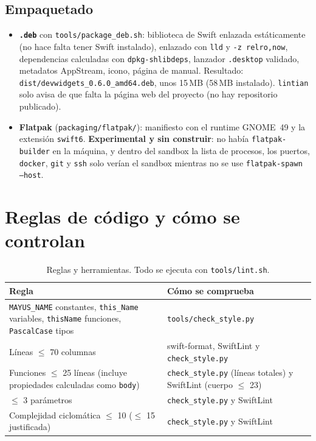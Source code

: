 \documentclass[11pt,a4paper]{article}
\begin{document}
\subsection{Empaquetado}
\begin{itemize}
  \item \textbf{\texttt{.deb}} con \texttt{tools/package\_deb.sh}:
    biblioteca de Swift enlazada estáticamente (no hace falta tener
    Swift instalado), enlazado con \texttt{lld} y \texttt{-z
    relro,now}, dependencias calculadas con \texttt{dpkg-shlibdeps},
    lanzador \texttt{.desktop} validado, metadatos AppStream, icono,
    página de manual. Resultado: \texttt{dist/devwidgets\_0.6.0\_amd64.deb},
    unos 15\,MB (58\,MB instalado). \texttt{lintian} solo avisa de que
    falta la página web del proyecto (no hay repositorio publicado).
  \item \textbf{Flatpak} (\texttt{packaging/flatpak/}): manifiesto
    con el runtime GNOME~49 y la extensión \texttt{swift6}.
    \textbf{Experimental y sin construir}: no había
    \texttt{flatpak-builder} en la máquina, y dentro del sandbox la
    lista de procesos, los puertos, \texttt{docker}, \texttt{git} y
    \texttt{ssh} solo verían el sandbox mientras no se use
    \texttt{flatpak-spawn --host}.
\end{itemize}

\section{Reglas de código y cómo se controlan}
\begin{table}[H]
\centering
\begin{tabularx}{\textwidth}{@{}XX@{}}
\toprule
\textbf{Regla} & \textbf{Cómo se comprueba}\\
\midrule
\texttt{MAYUS\_NAME} constantes, \texttt{this\_Name} variables,
\texttt{thisName} funciones, \texttt{PascalCase} tipos &
\texttt{tools/check\_style.py}\\
Líneas $\le$ 70 columnas & swift-format, SwiftLint y
\texttt{check\_style.py}\\
Funciones $\le$ 25 líneas (incluye propiedades calculadas como
\texttt{body}) & \texttt{check\_style.py} (líneas totales) y
SwiftLint (cuerpo $\le$ 23)\\
$\le$ 3 parámetros & \texttt{check\_style.py} y SwiftLint\\
Complejidad ciclomática $\le$ 10 ($\le$ 15 justificada) &
\texttt{check\_style.py} y SwiftLint\\
\bottomrule
\end{tabularx}
\caption{Reglas y herramientas. Todo se ejecuta con
\texttt{tools/lint.sh}.}
\end{table}
\end{document}
